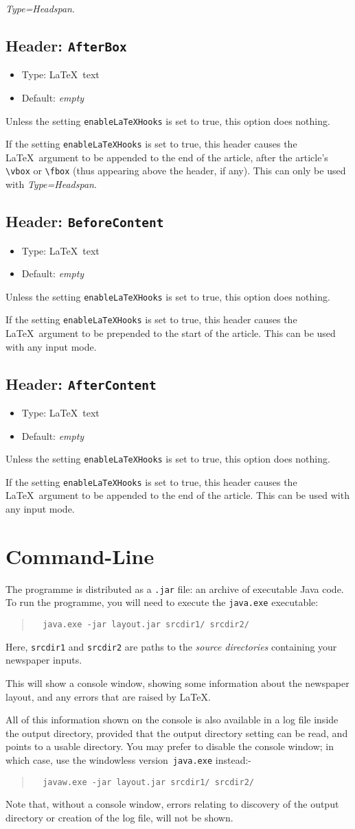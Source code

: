 \documentclass[a4paper,DIV=11]{scrartcl}
\newcommand{\property}[5]{
  \subsection{#1: \texttt{#2}}
  \begin{itemize}
  \item Type: #3
  \item Default: #4
  \end{itemize}
  #5
}
\newcommand{\header}{\property{Header}}
\begin{document}
\begin{multicols}{2}
{  \textit{Type=Headspan}.
  }
\header{AfterBox}{\LaTeX\ text}{\textit{empty}}{
  Unless the setting \texttt{enableLaTeXHooks} is set to true, this
  option does nothing.\par If the setting \texttt{enableLaTeXHooks} is
  set to true, this header causes the \LaTeX\ argument to be appended
  to the end of the article, after the article's
  \texttt{\textbackslash vbox} or \texttt{\textbackslash fbox} (thus
  appearing above the header, if any). This can only be used with
  \textit{Type=Headspan}.
  }
\header{BeforeContent}{\LaTeX\ text}{\textit{empty}}{
  Unless the setting \texttt{enableLaTeXHooks} is set to true, this
  option does nothing.\par If the setting \texttt{enableLaTeXHooks} is
  set to true, this header causes the \LaTeX\ argument to be prepended
  to the start of the article. This can be used with any input mode.
}
\header{AfterContent}{\LaTeX\ text}{\textit{empty}}{
  Unless the setting \texttt{enableLaTeXHooks} is set to true, this
  option does nothing.\par If the setting \texttt{enableLaTeXHooks} is
  set to true, this header causes the \LaTeX\ argument to be appended
  to the end of the article. This can be used with any input mode.
}
\end{multicols}

\section*{Command-Line}

The programme is distributed as a \verb!.jar! file: an archive of
executable Java code. To run the programme, you will need to execute
the \verb!java.exe! executable:

\begin{quote}
\begin{verbatim}
  java.exe -jar layout.jar srcdir1/ srcdir2/
\end{verbatim}
\end{quote}

Here, \verb!srcdir1! and \verb!srcdir2! are paths to the
\textit{source directories} containing your newspaper inputs.

This will show a console window, showing some information about the
newspaper layout, and any errors that are raised by \LaTeX.

All of this information shown on the console is also available in a
log file inside the output directory, provided that the output
directory setting can be read, and points to a usable directory. You
may prefer to disable the console window; in which case, use the
windowless version~\texttt{java.exe} instead:-

\begin{quote}
\begin{verbatim}
  javaw.exe -jar layout.jar srcdir1/ srcdir2/
\end{verbatim}
\end{quote}

Note that, without a console window, errors relating to discovery of
the output directory or creation of the log file, will not be shown.
\end{document}

